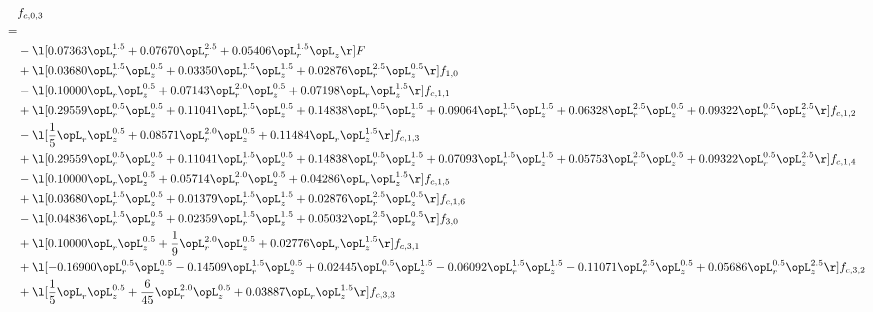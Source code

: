 \begin{alignat}{2} 
\label{eq:f_03_2} 
& f_{c,0,3} \nonumber \\ 
 = \\ 
& - \l[  0.07363 \opL_r^{1.5} +  0.07670 \opL_r^{2.5} +  0.05406 \opL_r^{1.5} \opL_z  \r] F \nonumber \\ 
& + \l[  0.03680 \opL_r^{1.5} \opL_z^{0.5} +  0.03350 \opL_r^{1.5} \opL_z^{1.5} +  0.02876 \opL_r^{2.5} \opL_z^{0.5}  \r] f_{1,0} \nonumber \\ 
& - \l[  0.10000 \opL_r \opL_z^{0.5} +  0.07143 \opL_r^{2.0} \opL_z^{0.5} +  0.07198 \opL_r \opL_z^{1.5}  \r] f_{c,1,1} \nonumber \\ 
& + \l[  0.29559 \opL_r^{0.5} \opL_z^{0.5} +  0.11041 \opL_r^{1.5} \opL_z^{0.5} +  0.14838 \opL_r^{0.5} \opL_z^{1.5} +  0.09064 \opL_r^{1.5} \opL_z^{1.5} +  0.06328 \opL_r^{2.5} \opL_z^{0.5} +  0.09322 \opL_r^{0.5} \opL_z^{2.5}  \r] f_{c,1,2} \nonumber \\ 
& - \l[ \frac{1}{5} \opL_r \opL_z^{0.5} +  0.08571 \opL_r^{2.0} \opL_z^{0.5} +  0.11484 \opL_r \opL_z^{1.5}  \r] f_{c,1,3} \nonumber \\ 
& + \l[  0.29559 \opL_r^{0.5} \opL_z^{0.5} +  0.11041 \opL_r^{1.5} \opL_z^{0.5} +  0.14838 \opL_r^{0.5} \opL_z^{1.5} +  0.07093 \opL_r^{1.5} \opL_z^{1.5} +  0.05753 \opL_r^{2.5} \opL_z^{0.5} +  0.09322 \opL_r^{0.5} \opL_z^{2.5}  \r] f_{c,1,4} \nonumber \\ 
& - \l[  0.10000 \opL_r \opL_z^{0.5} +  0.05714 \opL_r^{2.0} \opL_z^{0.5} +  0.04286 \opL_r \opL_z^{1.5}  \r] f_{c,1,5} \nonumber \\ 
& + \l[  0.03680 \opL_r^{1.5} \opL_z^{0.5} +  0.01379 \opL_r^{1.5} \opL_z^{1.5} +  0.02876 \opL_r^{2.5} \opL_z^{0.5}  \r] f_{c,1,6} \nonumber \\ 
& - \l[  0.04836 \opL_r^{1.5} \opL_z^{0.5} +  0.02359 \opL_r^{1.5} \opL_z^{1.5} +  0.05032 \opL_r^{2.5} \opL_z^{0.5}  \r] f_{3,0} \nonumber \\ 
& + \l[  0.10000 \opL_r \opL_z^{0.5} + \frac{1}{9} \opL_r^{2.0} \opL_z^{0.5} +  0.02776 \opL_r \opL_z^{1.5}  \r] f_{c,3,1} \nonumber \\ 
& + \l[  -0.16900 \opL_r^{0.5} \opL_z^{0.5}   -0.14509 \opL_r^{1.5} \opL_z^{0.5} +  0.02445 \opL_r^{0.5} \opL_z^{1.5}   -0.06092 \opL_r^{1.5} \opL_z^{1.5}   -0.11071 \opL_r^{2.5} \opL_z^{0.5} +  0.05686 \opL_r^{0.5} \opL_z^{2.5}  \r] f_{c,3,2} \nonumber \\ 
& + \l[ \frac{1}{5} \opL_r \opL_z^{0.5} + \frac{6}{45} \opL_r^{2.0} \opL_z^{0.5} +  0.03887 \opL_r \opL_z^{1.5}  \r] f_{c,3,3} \nonumber \\ 

\end{alignat}
